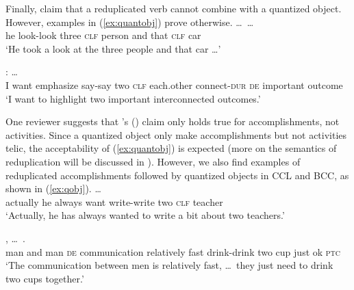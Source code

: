 \z
\z

Finally, \citet[322]{SuiHu2016} claim that a reduplicated verb cannot combine with a quantized object.
However, examples in (\ref{ex:quantobj}) prove otherwise.
\ea\label{ex:quantobj}
\ea\gll {} \ldots\,         \dots\\
he {} look-look three \textsc{clf} person and that \textsc{clf} car\\
\glt `He took a look at the three people and that car \ldots'

\ex \gll {}          : \ldots\\
I want emphasize say-say two \textsc{clf} each.other connect-\textsc{dur} \textsc{de} important outcome\\
\glt `I want to highlight two important interconnected outcomes.'
\z\z

\noindent
One reviewer suggests that \citeauthor{SuiHu2016}'s (\citeyear[322]{SuiHu2016}) claim only holds true for accomplishments, not activities.
Since a quantized object only make accomplishments but not activities telic, 
the acceptability of (\ref{ex:quantobj}) is expected 
(more on the semantics of reduplication will be discussed in ).
However, we also find examples of reduplicated accomplishments followed by quantized objects in CCL and BCC, as shown in (\ref{ex:qobj}).
\ea\label{ex:qobj}
\ea\label{ex:qobj1}
\gll {}        \ldots\\
actually he always want write-write two \textsc{clf} teacher\\ 
\glt `Actually, he has always wanted to write a bit about two teachers.'

\ex\label{ex:qobj2}%
\gll {}      , \ldots\,      .\\
man and man \textsc{de} communication relatively fast {} drink-drink two cup just ok \textsc{ptc}\\ 
\glt `The communication between men is relatively fast, \ldots\, they just need to drink two cups together.'

